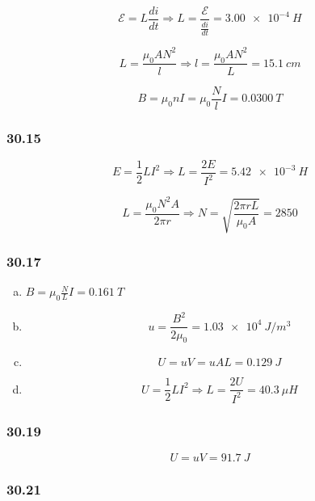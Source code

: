 \documentclass{article}
\begin{document}
\[\mathcal{E} = L \frac{di}{dt} \Rightarrow L = \frac{\mathcal{E}}{\frac{di}{dt}} = \qty{3.00e-4}{H}\]

\[L = \frac{\mu_0 A N^2}{l} \Rightarrow l = \frac{\mu_0 A N^2}{L} = \qty{15.1}{cm}\]

\[B = \mu_0 n I = \mu_0 \frac{N}{l} I = \qty{0.0300}{T}\]

\subsubsection{30.15}

\[E = \frac{1}{2} L I^2 \Rightarrow L = \frac{2 E}{I^2} = \qty{5.42e-3}{H}\]

\[L = \frac{\mu_0 N^2 A}{2 \pi r} \Rightarrow N = \sqrt{\frac{2 \pi r L}{\mu_0 A}} = 2850\]

\subsubsection{30.17}

\begin{enumerate}[(a)]
  \item $B = \mu_0 \frac{N}{L} I = \qty{0.161}{T}$

  \item \[u = \frac{B^2}{2 \mu_0} = \qty{1.03e4}{J/m^3}\]

  \item \[U = u V = u A L = \qty{0.129}{J}\]

  \item \[U = \frac{1}{2} L I^2 \Rightarrow L = \frac{2 U}{I^2} = \qty{40.3}{\mu H}\]
\end{enumerate}

\subsubsection{30.19}

\[U = u V = \qty{91.7}{J}\]

\subsubsection{30.21}
\end{document}
